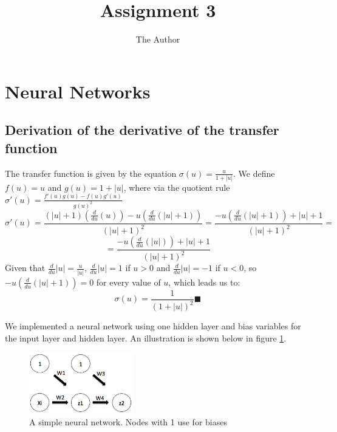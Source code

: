 \documentclass[11pt]{article}
\title{Assignment 3}
\author{The Author}
\date{} %
\begin{document}
\maketitle
{}


\section{Neural Networks}
\subsection{Derivation of the derivative of the transfer function}

The transfer function is given by the equation $ \sigma(u) = \frac{u}{1+|u|}$. We define $f(u)=u$ and $g(u)=1+|u|$, where via the quotient rule $\sigma'(u)=\frac{f'(u)g(u)-f(u)g'(u)}{g(u)^2}$
\[
\sigma'(u)=\frac{(|u|+1)  (\frac{d}{du}(u)) - u(\frac{d}{du}(|u|+1))
}
{(|u|+1)^2
}
=\frac{ -u(\frac{d}{du}(|u|+1)) +|u| +1 }
{(|u|+1)^2} =
\]
\[
=\frac{ -u(\frac{d}{du}(|u|)) +|u| + 1}
{(|u|+1)^2}
\]
Given that $\frac{d}{du}|u|=\frac{u}{|u|}$, $\frac{d}{du}|u|=1$ if $u>0$ and $\frac{d}{du}|u|=-1$ if $u<0$, so $-u(\frac{d}{du}(|u|+1))=0$ for every value of $u$, which leads us to:
\[
 \sigma(u) = \frac{1}{(1+|u|)^2} \blacksquare
\]

We implemented a neural network using one hidden layer and bias variables for the input layer and hidden layer. An illustration is shown below in figure \ref{graph}.


\begin{figure}[h!]
  \centering
\includegraphics[width=0.4\textwidth]{graph.png}
\caption{A simple neural network. Nodes with 1 use for biases}
\label{graph}
\end{figure}
\end{document}
